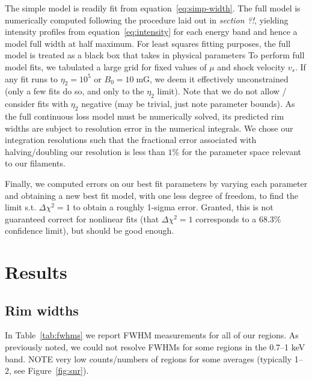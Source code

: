 \documentclass[iop, apj, numberedappendix, twocolappendix]{emulateapj}
\newcommand*{\mt}{\mathrm}
\newcommand*{\unit}[1]{\;\mt{#1}}  %
\begin{document}
The simple model is readily fit from equation~\eqref{eq:simp-width}.
The full model is numerically computed following the procedure laid out in
\emph{section ?!}, yielding intensity profiles from equation~\eqref{eq:intensity} for each
energy band and hence a model full width at half maximum.
For least squares fitting purposes, the full model is treated as a black box
that takes in physical parameters
To perform full model fits, we tabulated a large grid for fixed values of $\mu$
and shock velocity $v_s$.  If any fit runs to $\eta_2 = 10^5$ or $B_0 = 10
\unit{mG}$, we deem it effectively unconstrained (only a few fits do so, and
only to the $\eta_2$ limit).  Note that we do not allow / consider fits with
$\eta_2$ negative (may be trivial, just note parameter bounds).  As the full
continuous loss model must be numerically solved, its predicted rim widths are
subject to resolution error in the numerical integrals.  We chose our
integration resolutions such that the fractional error associated with
halving/doubling our resolution is less than $1\%$ for the parameter space
relevant to our filaments. 

Finally, we computed errors on our best fit parameters by varying each
parameter and obtaining a new best fit model, with one less degree of freedom,
to find the limit s.t. $\Delta \chi^2 = 1$ to obtain a roughly 1-sigma error.
Granted, this is not guaranteed correct for nonlinear fits (that $\Delta \chi^2
= 1$ corresponds to a $68.3$\% confidence limit), but should be good enough.

\section{Results}

\subsection{Rim widths}
\label{sec:fwhm-results}

In Table~\ref{tab:fwhms} we report FWHM measurements for all of our regions.
As previously noted, we could not resolve FWHMs for some regions in the 0.7--1 keV band.
NOTE very low counts/numbers of regions for some averages (typically 1--2, see
Figure~\ref{fig:snr}).
\end{document}
